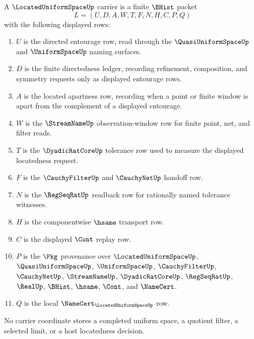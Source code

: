 \begin{definition}\label{def:located-uniform-space-carrier}
A $\LocatedUniformSpaceUp$ carrier is a finite $\BHist$ packet
$$
L=(U,D,A,W,T,F,N,H,C,P,Q)
$$
with the following displayed rows:
\begin{enumerate}
\item $U$ is the directed entourage row, read through the $\QuasiUniformSpaceUp$ and $\UniformSpaceUp$ naming surfaces.
\item $D$ is the finite directedness ledger, recording refinement, composition, and symmetry requests only as displayed entourage rows.
\item $A$ is the located apartness row, recording when a point or finite window is apart from the complement of a displayed entourage.
\item $W$ is the $\StreamNameUp$ observation-window row for finite point, net, and filter reads.
\item $T$ is the $\DyadicRatCoreUp$ tolerance row used to measure the displayed locatedness request.
\item $F$ is the $\CauchyFilterUp$ and $\CauchyNetUp$ handoff row.
\item $N$ is the $\RegSeqRatUp$ readback row for rationally named tolerance witnesses.
\item $H$ is the componentwise $\hsame$ transport row.
\item $C$ is the displayed $\Cont$ replay row.
\item $P$ is the $\Pkg$ provenance over $\LocatedUniformSpaceUp$, $\QuasiUniformSpaceUp$, $\UniformSpaceUp$, $\CauchyFilterUp$, $\CauchyNetUp$, $\StreamNameUp$, $\DyadicRatCoreUp$, $\RegSeqRatUp$, $\RealUp$, $\BHist$, $\hsame$, $\Cont$, and $\NameCert$.
\item $Q$ is the local $\NameCert_{\LocatedUniformSpaceUp}$ row.
\end{enumerate}
No carrier coordinate stores a completed uniform space, a quotient filter, a selected limit, or a host locatedness decision.
\end{definition}

